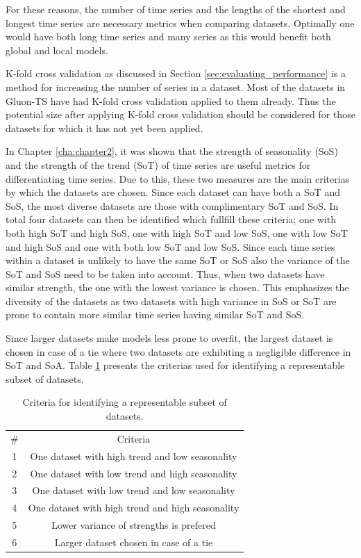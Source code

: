 For these reasons, the number of time series and the lengths of the shortest and longest time series are necessary metrics when comparing datasets. Optimally one would have both long time series and many series as this would benefit both global and local models.

K-fold cross validation as discussed in Section \ref{sec:evaluating_performance} is a method for increasing the number of series in a dataset. Most of the datasets in Gluon-TS have had K-fold cross validation applied to them already. Thus the potential size after applying K-fold cross validation should be considered for those datasets for which it has not yet been applied.

In Chapter \ref{cha:chapter2}, it was shown that the strength of seasonality (SoS) and the strength of the trend (SoT) of time series are useful metrics for differentiating time series. Due to this, these two measures are the main criterias by which the datasets are chosen. Since each dataset can have both a SoT and SoS, the most diverse datasets are those with complimentary SoT and SoS. In total four datasets can then be identified which fullfill these criteria; one with both high SoT and high SoS, one with high SoT and low SoS, one with low SoT and high SoS and one with both low SoT and low SoS. Since each time series within a dataset is unlikely to have the same SoT or SoS also the variance of the SoT and SoS need to be taken into account. Thus, when two datasets have similar strength, the one with the lowest variance is chosen. This emphasizes the diversity of the datasets as two datasets with high variance in SoS or SoT are prone to contain more similar time series having similar SoT and SoS.

Since larger datasets make models less prone to overfit, the largest dataset is chosen in case of a tie where two datasets are exhibiting a negligible difference in SoT and SoA. Table \ref{dataset_criteria} presents the criterias used for identifying a representable subset of datasets.

\begin{table}[h]
  \begin{tabular}{cc}
    \# & Criteria                                         \\
    1  & One dataset with high trend and low seasonality  \\
    2  & One dataset with low trend and high seasonality  \\
    3  & One dataset with low trend and low seasonality   \\
    4  & One dataset with high trend and high seasonality \\
    5  & Lower variance of strengths is prefered          \\
    6  & Larger dataset chosen in case of a tie           \\
  \end{tabular}
  \caption{Criteria for identifying a representable subset of datasets.}
  \label{dataset_criteria}
\end{table}


